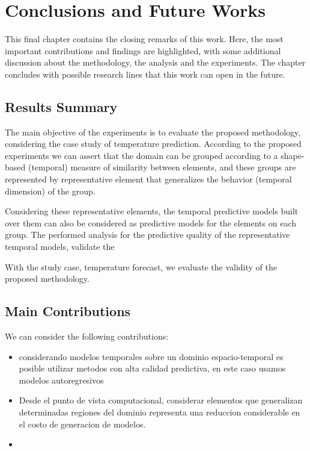 \chapter{Conclusions and Future Works}\label{chapter_Conclusions}

This final chapter contains the closing remarks of this work. Here, the most important contributions and findings are highlighted, with some additional discussion about the methodology, the analysis and the experiments. The chapter concludes with possible research lines that this work can open in the future.

\section{Results Summary}

The main objective of the experiments is to evaluate the proposed methodology, considering the case study of temperature prediction. According to the proposed experiments we can assert that the domain can be grouped according to a shape-based (temporal) measure of similarity between elements, and these groups are represented by representative element that generalizes the behavior (temporal dimension) of the group. 

Considering these representative elements, the temporal predictive models built over them can also be considered as predictive models for the elements on each group. The performed analysis for the predictive quality of the representative temporal models, validate the 

With the study case, temperature forecast, we evaluate the validity of the proposed methodology. 

\section{Main Contributions}
\label{Sec:MainContributions}

We can consider the following contributions:
\begin{itemize}
    \item considerando modelos temporales sobre un dominio espacio-temporal es posible utilizar metodos con alta calidad predictiva, en este caso usamos modelos autoregresivos
    \item Desde el punto de vista computacional, considerar elementos que generalizan determinadas regiones del dominio representa una reduccion considerable en el costo de generacion de modelos. 

    \item 
\end{itemize}


